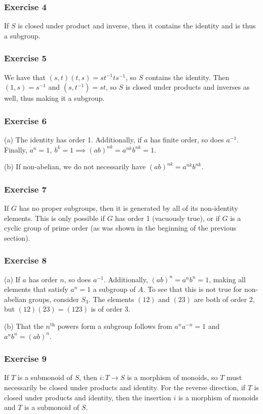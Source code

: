 \subsubsection{Exercise 4}
If $S$ is closed under product and inverse, then it contains the identity and is thus a subgroup.

\subsubsection{Exercise 5}
We have that $(s, t) (t, s) = st^{-1} ts^{-1} $, so $S$ contains the identity. Then $(1, s) = s^{-1}$ and
$(s, t^{-1}) = st$, so $S$ is closed under products and inverses as well, thus making it a subgroup.

\subsubsection{Exercise 6}
(a) The identity has order 1. Additionally, if $a$ has finite order, so does $a^{-1}$. Finally,
$a^n = 1, \: b^k = 1 \implies (ab)^{nk} = a^{nk} b^{nk} = 1$.

(b) If non-abelian, we do not necessarily have $(ab)^{nk} = a^{nk} b^{nk}$.

\subsubsection{Exercise 7}
If $G$ has no proper subgroups, then it is generated by all of its non-identity elements. 
This is only possible if $G$ has order 1 (vacuously true), or if $G$ is a cyclic group of
prime order (as was shown in the beginning of the previous section).

\subsubsection{Exercise 8}
(a) If $a$ has order $n$, so does $a^{-1}$. Additionally, $(ab)^n = a^n b^n = 1$, making all elements that
satisfy $a^n = 1$ a subgroup of $A$. To see that this is not true for non-abelian groups, consider $S_3$.
The elements $(1 2)$ and $(2 3)$ are both of order 2, but $(1 2) (2 3) = (1 2 3)$ is of order 3.

(b) That the $n^{\text{th}}$ powers form a subgroup follows from $a^n a^{-n} = 1$ and $a^n b^n = (ab)^{n}$.

\subsubsection{Exercise 9}
If $T$ is a submonoid of $S$, then $i: T \to S$ is a morphism of monoids, so $T$ must necessarily be
closed under products and identity. For the reverse direction, if $T$ is closed under products and
identity, then the insertion $i$ is a morphism of monoids and $T$ is a submonoid of $S$.

